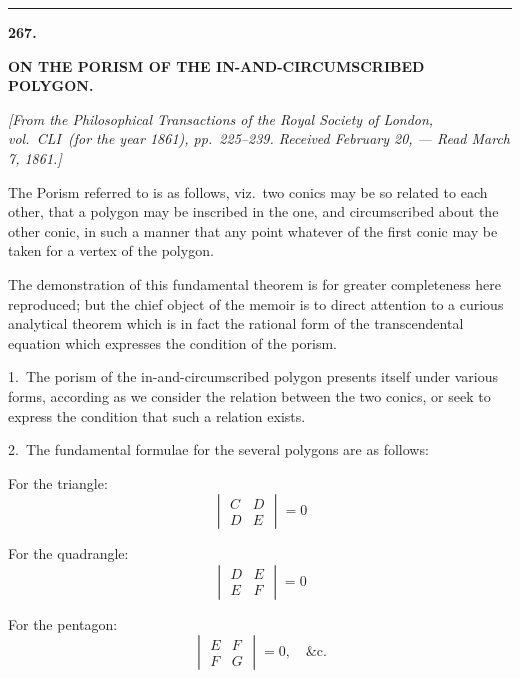 \documentclass[11pt,a4paper]{article}
\theoremstyle{plain}
\theoremstyle{definition}
\theoremstyle{remark}
\begin{document}
\bigskip
\begin{center}
\rule{0.5\textwidth}{0.4pt}
\end{center}


\newpage
\setcounter{page}{310}
\begin{center}
\textbf{267.}\par
\smallskip
\textbf{ON THE PORISM OF THE IN-AND-CIRCUMSCRIBED POLYGON.}\par
\smallskip
\textit{[From the \textit{Philosophical Transactions} of the Royal Society of London, vol.~CLI\ (for the year 1861), pp.~225--239. Received February 20, --- Read March 7, 1861.]}
\end{center}

\smallskip

The Porism referred to is as follows, viz.\ two conics may be so related to each other, that a polygon may be inscribed in the one, and circumscribed about the other conic, in such a manner that any point whatever of the first conic may be taken for a vertex of the polygon.

The demonstration of this fundamental theorem is for greater completeness here reproduced; but the chief object of the memoir is to direct attention to a curious analytical theorem which is in fact the rational form of the transcendental equation which expresses the condition of the porism.

1.\ The porism of the in-and-circumscribed polygon presents itself under various forms, according as we consider the relation between the two conics, or seek to express the condition that such a relation exists.

2.\ The fundamental formulae for the several polygons are as follows:

For the triangle:
\[
\begin{vmatrix}
C & D \\
D & E
\end{vmatrix} = 0
\]

For the quadrangle:
\[
\begin{vmatrix}
D & E \\
E & F
\end{vmatrix} = 0
\]

For the pentagon:
\[
\begin{vmatrix}
E & F \\
F & G
\end{vmatrix} = 0,\quad \text{\&c.}
\]
\end{document}
